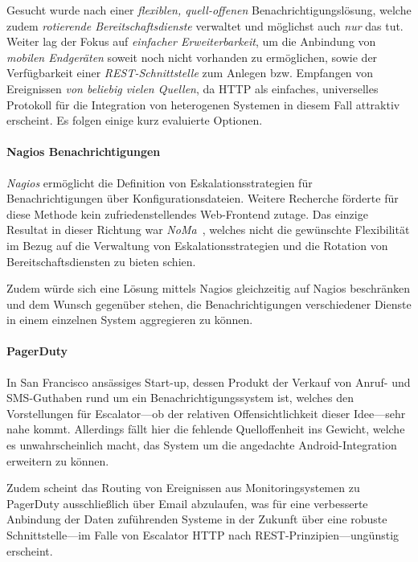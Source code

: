 \documentclass[11pt,utf8,notoc,bibnum,german,final]{zihpub}
\begin{document}
Gesucht wurde nach einer \emph{flexiblen, quell-offenen}
Benachrichtigungslösung, welche zudem \emph{rotierende Bereitschaftsdienste}
verwaltet und möglichst auch \emph{nur} das tut. Weiter lag der Fokus auf
\emph{einfacher Erweiterbarkeit}, um die Anbindung von \emph{mobilen
Endgeräten} soweit noch nicht vorhanden zu ermöglichen, sowie der Verfügbarkeit
einer \emph{REST-Schnittstelle} zum Anlegen bzw. Empfangen von Ereignissen
\emph{von beliebig vielen Quellen}, da HTTP als einfaches, universelles
Protokoll für die Integration von heterogenen Systemen in diesem Fall attraktiv
erscheint. Es folgen einige kurz evaluierte Optionen.

\paragraph{Nagios Benachrichtigungen~\cite{nagios-notifications}}

\emph{Nagios} ermöglicht die Definition von Eskalationsstrategien für
Benachrichtigungen über Konfigurationsdateien. Weitere Recherche förderte für
diese Methode kein zufriedenstellendes Web-Frontend zutage. Das einzige
Resultat in dieser Richtung war \emph{NoMa}~\cite{noma}, welches nicht die gewünschte
Flexibilität im Bezug auf die Verwaltung von Eskalationsstrategien und die
Rotation von Bereitschaftsdiensten zu bieten schien.

Zudem würde sich eine Lösung mittels Nagios gleichzeitig auf Nagios beschränken
und dem Wunsch gegenüber stehen, die Benachrichtigungen verschiedener Dienste
in einem einzelnen System aggregieren zu können.

\paragraph{PagerDuty~\cite{pagerduty}}

In San Francisco ansässiges Start-up, dessen Produkt der Verkauf von Anruf- und
SMS-Guthaben rund um ein Benachrichtigungssystem ist, welches den Vorstellungen
für Escalator—ob der relativen Offensichtlichkeit dieser Idee—sehr nahe kommt.
Allerdings fällt hier die fehlende Quelloffenheit ins Gewicht, welche es
unwahrscheinlich macht, das System um die angedachte Android-Integration
erweitern zu können.

Zudem scheint das Routing von Ereignissen aus Monitoringsystemen zu PagerDuty
ausschließlich über Email abzulaufen, was für eine verbesserte Anbindung der
Daten zuführenden Systeme in der Zukunft über eine robuste Schnittstelle—im
Falle von Escalator HTTP nach REST-Prinzipien—ungünstig erscheint.
\end{document}

